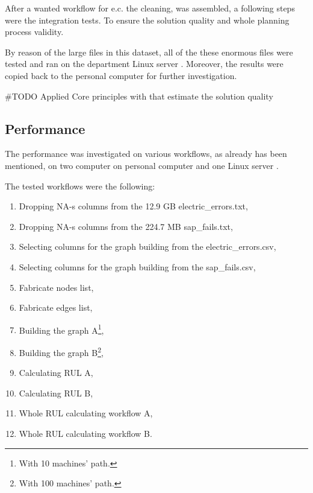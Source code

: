 After a wanted workflow for e.c. the cleaning, was assembled, a following steps were the integration tests. To ensure the solution quality and whole planning process validity.

By reason of the large files in this dataset, all of the these enormous files were tested and ran on the department Linux server \cite{Batman}.
Moreover, the results were copied back to the personal computer for further investigation.

\#TODO Applied Core principles with that estimate the solution quality
\subsection{Performance}
The performance was investigated on various workflows, as already has been mentioned, on two computer on personal computer \cite{Latitude} and one Linux server \cite{Batman}.

The tested workflows were the following:
\begin{enumerate}
	\item{Dropping NA-s columns from the 12.9 GB electric\_errors.txt,}
	\item{Dropping NA-s columns from the 224.7 MB sap\_fails.txt,}
	\item{Selecting columns for the graph building from the electric\_errors.csv,}
	\item{Selecting columns for the graph building from the sap\_fails.csv,}
	\item{Fabricate nodes list,}
	\item{Fabricate edges list,}
	\item{Building the graph A\footnote{With 10 machines' path.},}
	\item{Building the graph B\footnote{With 100 machines' path.},}
	\item{Calculating RUL A,}
	\item{Calculating RUL B,}
	\item{Whole RUL calculating workflow A,}
	\item{Whole RUL calculating workflow B.}
\end{enumerate} 

